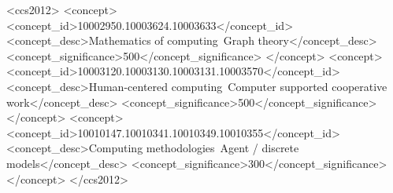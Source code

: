 \documentclass[manuscript,screen,review,acmsmall]{acmart}
\begin{document}
\begin{CCSXML}
<ccs2012>
<concept>
<concept_id>10002950.10003624.10003633</concept_id>
<concept_desc>Mathematics of computing~Graph theory</concept_desc>
<concept_significance>500</concept_significance>
</concept>
<concept>
<concept_id>10003120.10003130.10003131.10003570</concept_id>
<concept_desc>Human-centered computing~Computer supported cooperative work</concept_desc>
<concept_significance>500</concept_significance>
</concept>
<concept>
<concept_id>10010147.10010341.10010349.10010355</concept_id>
<concept_desc>Computing methodologies~Agent / discrete models</concept_desc>
<concept_significance>300</concept_significance>
</concept>
</ccs2012>
\end{CCSXML}





\maketitle
\end{document}
